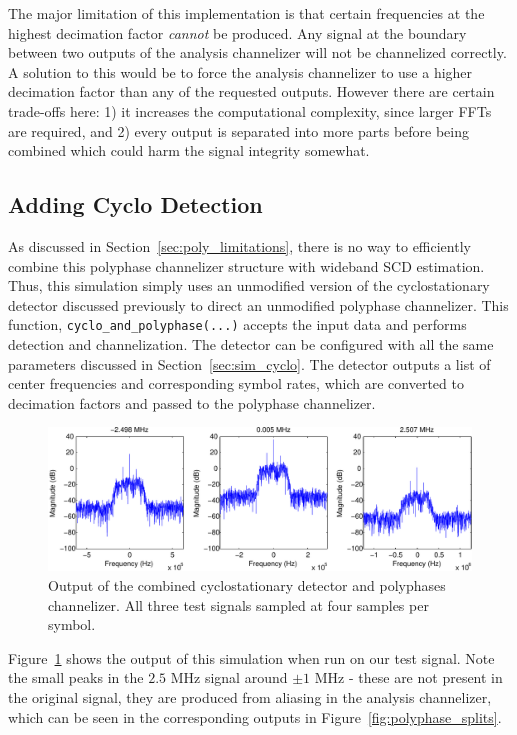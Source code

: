 \documentclass[12pt]{report}
\begin{document}
The major limitation of this implementation is that certain frequencies
at the highest decimation factor \emph{cannot} be produced. Any signal at the
boundary between two outputs of the analysis channelizer will not be
channelized correctly. A solution to this would be to force the analysis
channelizer to use a higher decimation factor than any of the requested outputs.
However there are certain trade-offs here: 1) it increases the computational
complexity, since larger FFTs are required, and 2) every output is separated
into more parts before being combined which could harm the signal integrity
somewhat.

\subsection{Adding Cyclo Detection}
\label{sec:sim_poly_cyclo}
As discussed in Section~\ref{sec:poly_limitations}, there is no way to
efficiently combine this polyphase channelizer structure with wideband SCD
estimation.  Thus, this simulation simply uses an unmodified version of the
cyclostationary detector discussed previously to direct an unmodified polyphase
channelizer. This function, \texttt{cyclo\_and\_polyphase(...)} accepts the input
data and performs detection and channelization. The detector can be configured
with all the same parameters discussed in Section~\ref{sec:sim_cyclo}. The
detector outputs a list of center frequencies and corresponding symbol rates,
which are converted to decimation factors and passed to the polyphase
channelizer.

\begin{figure}[bh!]
    \includegraphics[width=\textwidth]{cyclo_poly_results}%
\caption{Output of the combined cyclostationary detector and polyphases channelizer. All three test signals sampled at four samples per symbol.}
\label{fig:cyclo_poly_results}
\end{figure}

Figure~\ref{fig:cyclo_poly_results} shows the output of this simulation when run
on our test signal. Note the small peaks in the $2.5$ MHz signal around $\pm1$
MHz - these are not present in the original signal, they are produced from
aliasing in the analysis channelizer, which can be seen in the corresponding
outputs in Figure~\ref{fig:polyphase_splits}.
\end{document}
